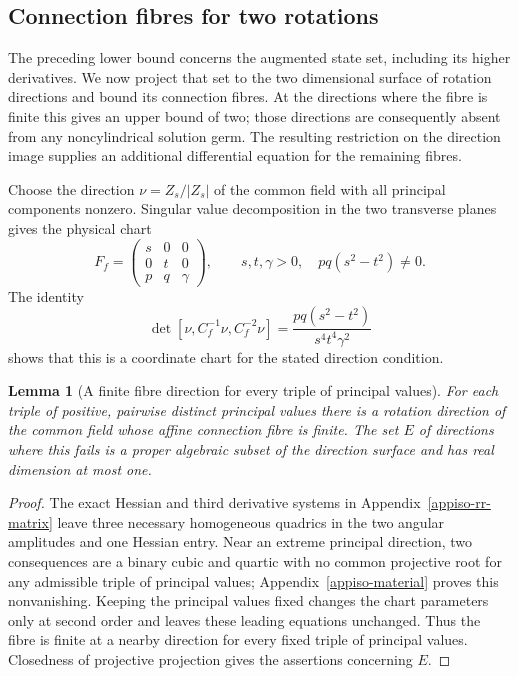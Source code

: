 \documentclass[11pt,a4paper]{article}
\numberwithin{equation}{section}
\theoremstyle{plain}
\newtheorem{lemma}[theorem]{Lemma}
\theoremstyle{definition}
\theoremstyle{remark}
\begin{document}
\subsection{Connection fibres for two rotations}\label{iso:rotation-fibres}

The preceding lower bound concerns the augmented state set,
including its higher derivatives.  We now project that set to the two
dimensional surface of rotation directions and bound its connection
fibres.  At the directions where the fibre is finite this gives an
upper bound of two; those directions are consequently absent from any
noncylindrical solution germ.  The resulting restriction on the direction
image supplies an additional differential equation for the remaining
fibres.  

Choose the direction $\nu=Z_s/|Z_s|$ of the common field with
all principal components nonzero. Singular value decomposition in the
two transverse planes gives the physical chart
\begin{equation}\label{iso:rr-arrow}
 F_f=\begin{pmatrix}s&0&0\\0&t&0\\p&q&\gamma\end{pmatrix},\qquad
 s,t,\gamma>0,\quad pq(s^2-t^2)\ne0.
\end{equation}
The identity
\[
 \det[\nu,C_f^{-1}\nu,C_f^{-2}\nu]
       =\frac{pq(s^2-t^2)}{s^4t^4\gamma^2}
\]
shows that this is a coordinate chart for the stated direction
condition. 

\begin{lemma}[A finite fibre direction for every triple of principal values]
\label{iso:rr-good-direction}
For each triple of positive, pairwise distinct principal values there is a rotation direction
of the common field whose affine connection fibre is finite. The set $E$ of directions
where this fails is a proper algebraic subset of the direction
surface and has real dimension at most one.
\end{lemma}
\begin{proof}
The exact Hessian and third derivative systems in
Appendix~\ref{appiso-rr-matrix} leave three necessary homogeneous
quadrics in the two angular amplitudes and one Hessian entry.
Near an extreme principal direction, two consequences are a binary
cubic and quartic with no common projective root for any admissible
triple of principal values; Appendix~\ref{appiso-material} proves this
nonvanishing. Keeping the principal values fixed changes the chart
parameters only at second order and leaves these leading equations
unchanged. Thus the fibre is finite at a nearby direction for every
fixed triple of principal values. Closedness of projective projection gives the
assertions concerning $E$.
\end{proof}
\end{document}
